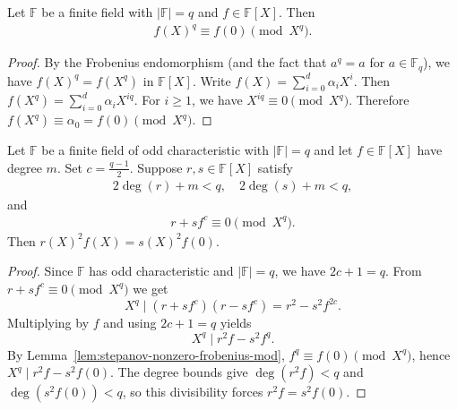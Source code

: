 \begin{lemma}\label{lem:stepanov-nonzero-frobenius-mod} \leanok {}
  Let $\mathbb{F}$ be a finite field with $|\mathbb{F}| = q$ and $f \in \mathbb{F}[X]$. Then
  \begin{align*}
    f(X)^q \equiv f(0) \pmod{X^q}.
  \end{align*}
\end{lemma}
\begin{proof} \leanok
  By the Frobenius endomorphism (and the fact that $a^q = a$ for $a \in \mathbb{F}_q$), we have
  $f(X)^q = f(X^q)$ in $\mathbb{F}[X]$. Write $f(X) = \sum_{i=0}^d \alpha_i X^i$. Then
  $f(X^q) = \sum_{i=0}^d \alpha_i X^{iq}$. For $i \geq 1$, we have $X^{iq} \equiv 0 \pmod{X^q}$.
  Therefore $f(X^q) \equiv \alpha_0 = f(0) \pmod{X^q}$.
\end{proof}

\begin{lemma}\label{lem:stepanov-nonzero-polynomial-equality} \leanok {}
  Let $\mathbb{F}$ be a finite field of odd characteristic with $|\mathbb{F}| = q$ and let $f \in \mathbb{F}[X]$ have degree $m$. Set $c = \frac{q-1}{2}$. Suppose $r, s \in \mathbb{F}[X]$ satisfy
  \begin{align*}
    2\deg(r) + m < q, \quad 2\deg(s) + m < q,
  \end{align*}
  and
  \begin{align*}
    r + s f^c \equiv 0 \pmod{X^q}.
  \end{align*}
  Then $r(X)^2 f(X) = s(X)^2 f(0)$.
\end{lemma}
\begin{proof} \leanok
  Since $\mathbb{F}$ has odd characteristic and $|\mathbb{F}| = q$, we have $2c + 1 = q$.
  From $r + s f^c \equiv 0 \pmod{X^q}$ we get
  \[
    X^q \mid (r + s f^c)(r - s f^c) = r^2 - s^2 f^{2c}.
  \]
  Multiplying by $f$ and using $2c + 1 = q$ yields
  \[
    X^q \mid r^2 f - s^2 f^q.
  \]
  By Lemma~\ref{lem:stepanov-nonzero-frobenius-mod}, $f^q \equiv f(0) \pmod{X^q}$, hence
  $X^q \mid r^2 f - s^2 f(0)$.
  The degree bounds give $\deg(r^2 f) < q$ and $\deg(s^2 f(0)) < q$, so this divisibility forces
  $r^2 f = s^2 f(0)$.
\end{proof}

